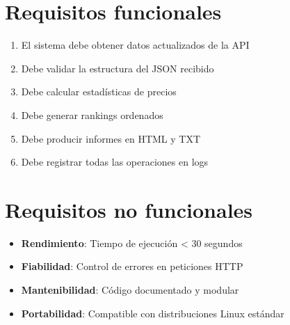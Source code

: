 \section{Requisitos funcionales}

\begin{enumerate}
  \item El sistema debe obtener datos actualizados de la API
  \item Debe validar la estructura del JSON recibido
  \item Debe calcular estadísticas de precios
  \item Debe generar rankings ordenados
  \item Debe producir informes en HTML y TXT
  \item Debe registrar todas las operaciones en logs
\end{enumerate}

\section{Requisitos no funcionales}

\begin{itemize}
  \item \textbf{Rendimiento}: Tiempo de ejecución < 30 segundos
  \item \textbf{Fiabilidad}: Control de errores en peticiones HTTP
  \item \textbf{Mantenibilidad}: Código documentado y modular
  \item \textbf{Portabilidad}: Compatible con distribuciones Linux estándar
\end{itemize}
